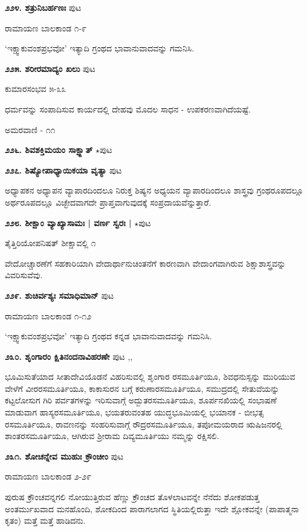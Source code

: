 \medskip
\noindent\textbf{೨೨೪. ಶತ್ರುನಿಬರ್ಹಣಃ} \hfill ಪುಟ \pageref{250}

\hfill ರಾಮಾಯಣ ಬಾಲಕಾಂಡ ೧-೯

`ಇಕ್ಷ್ವಾಕುವಂಶಪ್ರಭವೋ' ಇತ್ಯಾದಿ ಗ್ರಂಥದ ಭಾವಾನುವಾದವನ್ನು ಗಮನಿಸಿ.

\medskip
\noindent\textbf{೨೨೫. ಶರೀರಮಾದ್ಯಂ ಖಲು} \hfill ಪುಟ \pageref{76}

\hfill ಕುಮಾರಸಂಭವ ೫-೩೩

ಧರ್ಮವನ್ನು ಸಂಪಾದಿಸುವ ಕಾರ್ಯದಲ್ಲಿ ದೇಹವು ಮೊದಲ ಸಾಧನ - ಉಪಕರಣವಾಗಿದೆಯಷ್ಟೆ. 

\hfill ಅಮರವಾಣಿ - ೧೧

\medskip
\noindent\textbf{೨೨೬. ಶಿವಶಕ್ತಿಮಯಂ ಸಾಕ್ಷ್ಜಾತ್} $\star$\hfill ಪುಟ \pageref{32}

\medskip
\noindent\textbf{೨೨೭. ಶಿಷ್ಯೋಪಾಧ್ಯಾಯಿಕಯಾ ವೃತ್ಯಾ} \hfill ಪುಟ \pageref{45}

ಅಧ್ಯಾಪಕನ ಅಧ್ಯಾಪನ ವ್ಯಾಪಾರದಿಂದಲೂ ನಿರುಕ್ತ ಶಿಷ್ಯನ ಅಧ್ಯಯನ ವ್ಯಾಪಾರದಿಂದಲೂ ಶಾಸ್ತ್ರವು ಗ್ರಂಥರೂಪದಲ್ಲೂ ಅರ್ಥರೂಪದಲ್ಲೂ ವಿಚ್ಛೇದವಾಗದೇ ಪ್ರಾಪ್ತವಾಗುವುದಕ್ಕೆ ಸಂಪ್ರದಾಯವೆನ್ನುತ್ತಾರೆ.

\medskip
\noindent\textbf{೨೨೮. ಶೀಕ್ಷಾಂ ವ್ಯಾಖ್ಯಾಸಾಮಃ | ವರ್ಣ ಸ್ವರಃ |} $\star$\hfill ಪುಟ \pageref{10}

\hfill ತೈತ್ತಿರಿಯೋಪನಿಷತ್ ಶೀಕ್ಷಾವಲ್ಲಿ ೧

ವೇದೋಚ್ಚಾರಣೆಗೆ ಸಹಕಾರಿಯಾಗಿ ವೇದಾರ್ಥಾನುಚಿಂತನೆಗೆ ಕಾರಣವಾಗಿ ವೇದಾಂಗವಾಗಿರುವ ಶಿಕ್ಷಾಶಾಸ್ತ್ರವನ್ನು ವಿವರಿಸುವೆವು.

\medskip
\noindent\textbf{೨೨೯. ಶುಚಿರ್ವಶ್ಯಃ ಸಮಾಧಿಮಾನ್} \hfill ಪುಟ \pageref{255}

\hfill ರಾಮಾಯಣ ಬಾಲಕಾಂಡ ೧-೧೨

`ಇಕ್ಷ್ವಾಕುವಂಶಪ್ರಭವೋ' ಇತ್ಯಾದಿ ಗ್ರಂಥದ ಕನ್ನಡ ಭಾವಾನುವಾದವನ್ನು ಗಮನಿಸಿ.

\medskip
\noindent\textbf{೨೩೦. ಶೃಂಗಾರಂ ಕ್ಷಿತಿನಂದನಾವಿಹರಣೇ} \hfill ಪುಟ \pageref{182},\pageref{208},\pageref{219}

ಭೂಮಿಸುತೆಯಾದ ಸೀತಾದೇವಿಯೊಡನೆ ವಿಹರಿಸುವಲ್ಲಿ ಶೃಂಗಾರ ರಸಮೂರ್ತಿಯೂ, ಶಿವಧನುಸ್ಸನ್ನು ಮುರಿಯುವ ವೇಳೆಗೆ ವೀರರಸಮೂರ್ತಿಯೂ, ಕಾಕಾಸುರನ ಬಗ್ಗೆ ಕರುಣಾರಸಮೂರ್ತಿಯೂ, ಸಮುದ್ರದಲ್ಲಿ ಸೇತುವೆಯನ್ನು ಕಟ್ಟಲೋಸುಗ ಗಿರಿ ಪರ್ವತಗಳನ್ನು ಇರಿಸುವಾಗ್ಗೆ ಅದ್ಬುತರಸಮೂರ್ತಿಯೂ, ಶೂರ್ಪನಖಿಯಲ್ಲಿ ಸಂಭಾಷಣೆ ಮಾಡುವಾಗ ಹಾಸ್ಯರಸಮೂರ್ತಿಯೂ, ಭಯತರುವಂತಹ ಯುದ್ಧಭೂಮಿಯಲ್ಲಿ ಭಯಾನಕ - ಬೀಭತ್ಸ ರಸಮೂರ್ತಿಯೂ, ರಾವಣನನ್ನು ಸಂಹರಿಸುವಾಗ್ಗೆ ರೌದ್ರರಸಮೂರ್ತಿಯೂ, ತಪೋಮಯರಾದ ಋಷಿಜನರಲ್ಲಿ ಶಾಂತರಸಮೂರ್ತಿಯೂ, ಆಗಿರುವ ಶ್ರೀರಾಮ ದಿವ್ಯಮೂರ್ತಿಯು ನಮ್ಮನ್ನು ರಕ್ಷಿಸಲಿ.

\medskip
\noindent\textbf{೨೩೧. ಶೋಚನ್ನೇವ ಮುಹುಃ ಕ್ರೌಂಚೀಂ} \hfill ಪುಟ \pageref{203}

\hfill ರಾಮಾಯಣ ಬಾಲಕಾಂಡ ೨-೨೯

ಪುರುಷ ಕ್ರೌಂಚವನ್ನಗಲಿ ನೋಯುತ್ತಿರುವ ಹೆಣ್ಣು ಕ್ರೌಂಚದ ತೊಳಲಾಟವನ್ನೇ ನೆನೆದು ಶೋಕಪಡುತ್ತ ಅಂತರ್ಮುಖವಾದ ಮನಹೊಂದಿ, ಶೋಕದಿಂದ ಪಾರಾಗಲಾಗದ ಸ್ಥಿತಿಯಲ್ಲಿರುತ್ತಾ ಇದೇ ಶ್ಲೋಕವನ್ನೇ (ಪಾಪಾತ್ಮನಾ ಕೃತಂ) ಮತ್ತೆ ಮತ್ತೆ ಹಾಡಿದನು.

